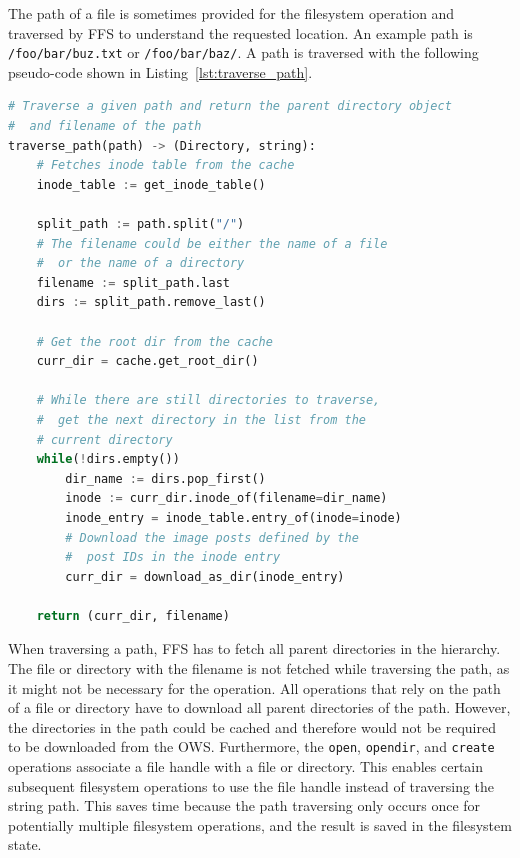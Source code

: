 The path of a file is sometimes provided for the filesystem operation and traversed by \gls{FFS} to understand the requested location. An example path is \texttt{/foo/bar/buz.txt} or \texttt{/foo/bar/baz/}. A path is traversed with the following \mbox{pseudo-code} shown in Listing~\ref{lst:traverse_path}.

\begin{lstlisting}[language=python, caption={Pseudocode of traversing a given path, returning the \texttt{Directory} and the filename}, label=lst:traverse_path,breaklines=true, basicstyle=\footnotesize, float]
# Traverse a given path and return the parent directory object
#  and filename of the path
traverse_path(path) -> (Directory, string):
	# Fetches inode table from the cache
	inode_table := get_inode_table()
	
	split_path := path.split("/")
	# The filename could be either the name of a file 
	#  or the name of a directory
	filename := split_path.last
	dirs := split_path.remove_last()

	# Get the root dir from the cache
	curr_dir = cache.get_root_dir()

	# While there are still directories to traverse,
	#  get the next directory in the list from the 
	# current directory
	while(!dirs.empty())
		dir_name := dirs.pop_first()
		inode := curr_dir.inode_of(filename=dir_name)
		inode_entry = inode_table.entry_of(inode=inode)
		# Download the image posts defined by the 
		#  post IDs in the inode entry
		curr_dir = download_as_dir(inode_entry)
	
	return (curr_dir, filename)

\end{lstlisting}

When traversing a path, \gls{FFS} has to fetch all parent directories in the hierarchy. The file or directory with the filename is not fetched while traversing the path, as it might not be necessary for the operation. All operations that rely on the path of a file or directory have to download all parent directories of the path. However, the directories in the path could be cached and therefore would not be required to be downloaded from the \gls{OWS}. Furthermore, the \texttt{open}, \texttt{opendir}, and \texttt{create} operations associate a file handle with a file or directory. This enables certain subsequent filesystem operations to use the file handle instead of traversing the string path. This saves time because the path traversing only occurs once for potentially multiple filesystem operations, and the result is saved in the filesystem state.


